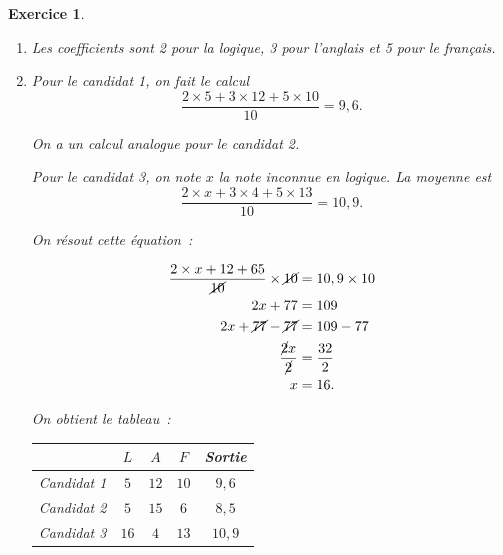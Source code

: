 \documentclass[10pt]{article}
\newtheorem{exo}{Exercice}
\begin{document}
\begin{exo}

\begin{enumerate}
\item Les coefficients sont 2 pour la logique, 3 pour l'anglais et 5 pour le français.
\item Pour le candidat 1, on fait le calcul \[\frac{2\times 5+3\times 12+5\times 10}{10}=9,6.\]

On a un calcul analogue pour le candidat 2.

\medskip

Pour le candidat 3, on note $x$ la note inconnue en logique. La moyenne est 
\[\frac{2\times x+3\times 4+5\times 13}{10}=10,9.\]

On résout cette équation~:

\begin{align*}
\frac{2\times x+12+65}{\cancel{10}}\times \cancel{10}&=10,9\times 10\\
2x+77&=109\\
2x+\cancel{77}-\cancel{77}&=109-77\\
\frac{\cancel{2}x}{\cancel{2}}&=\frac{32}{2}\\
x&=16.
\end{align*}

\medskip

On obtient le tableau~:

\begin{center}
\begin{tabular}{|l|c|c|c|c|}
\hline
&$L$&$A$&$F$&Sortie\\
\hline
   Candidat 1 &$5$ &$12$ &$10$ &$9,6$\\
	\hline
   Candidat 2 &$5$&$15$&$6$&$8,5$ \\
	\hline
	Candidat 3 &$16$&$4$&$13$&$10,9$ \\
	\hline
\end{tabular}
\end{center}

\end{enumerate}

\end{exo}
\end{document}
